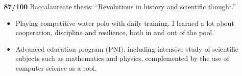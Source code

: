 	\divider

	\newline
	\textbf{87/100} Baccalaureate thesis: ``Revolutions in history and scientific thought.''
	\medskip\
	\begin{itemize}
		\item Playing competitive water polo with daily training. I learned a lot about cooperation, discipline and resilience, both in and out of the pool.
		\item Advanced education program (PNI), including intensive study of scientific subjects such as mathematics and physics, complemented by the use of computer science as a tool.
	\end{itemize}

	\bigskip

